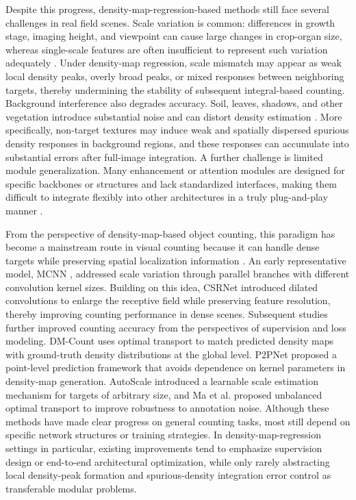 \documentclass[a4paper,fleqn]{cas-sc}
\begin{document}
	Despite this progress, density-map-regression-based methods still face several challenges in real field scenes. Scale variation is common: differences in growth stage, imaging height, and viewpoint can cause large changes in crop-organ size, whereas single-scale features are often insufficient to represent such variation adequately \cite{ref20,ref23}. Under density-map regression, scale mismatch may appear as weak local density peaks, overly broad peaks, or mixed responses between neighboring targets, thereby undermining the stability of subsequent integral-based counting. Background interference also degrades accuracy. Soil, leaves, shadows, and other vegetation introduce substantial noise and can distort density estimation \cite{ref4,ref5}. More specifically, non-target textures may induce weak and spatially dispersed spurious density responses in background regions, and these responses can accumulate into substantial errors after full-image integration. A further challenge is limited module generalization. Many enhancement or attention modules are designed for specific backbones or structures and lack standardized interfaces, making them difficult to integrate flexibly into other architectures in a truly plug-and-play manner \cite{ref29,ref27}.
	
	From the perspective of density-map-based object counting, this paradigm has become a mainstream route in visual counting because it can handle dense targets while preserving spatial localization information \cite{ref34,ref35}. An early representative model, MCNN \cite{ref20}, addressed scale variation through parallel branches with different convolution kernel sizes. Building on this idea, CSRNet \cite{ref21} introduced dilated convolutions to enlarge the receptive field while preserving feature resolution, thereby improving counting performance in dense scenes. Subsequent studies further improved counting accuracy from the perspectives of supervision and loss modeling. DM-Count \cite{ref24} uses optimal transport to match predicted density maps with ground-truth density distributions at the global level. P2PNet \cite{ref36} proposed a point-level prediction framework that avoids dependence on kernel parameters in density-map generation. AutoScale \cite{ref37} introduced a learnable scale estimation mechanism for targets of arbitrary size, and Ma et al. \cite{ref38} proposed unbalanced optimal transport to improve robustness to annotation noise. Although these methods have made clear progress on general counting tasks, most still depend on specific network structures or training strategies. In density-map-regression settings in particular, existing improvements tend to emphasize supervision design or end-to-end architectural optimization, while only rarely abstracting local density-peak formation and spurious-density integration error control as transferable modular problems.
	
\end{document}
